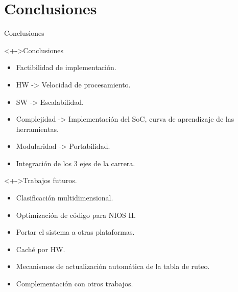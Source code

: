 \documentclass[xcolor=dvipsnames]{beamer}
\begin{document}
\section{Conclusiones}
\begin{frame}{Conclusiones} 
\begin{block}<+->{Conclusiones}   
    \begin{itemize}
      \scriptsize
     	\item Factibilidad de implementación.
     	\item HW -> Velocidad de procesamiento.
     	\item SW -> Escalabilidad.
     	\item Complejidad -> Implementación del SoC, curva de aprendizaje de las herramientas.
     	\item Modularidad -> Portabilidad.
     	\item Integración de los 3 ejes de la carrera.      	
    \end{itemize}
  \end{block}
  \begin{block}<+->{Trabajos futuros.}   
    \begin{itemize}
      \scriptsize
     	\item Clasificación multidimensional.
     	\item Optimización de código para NIOS II.
     	\item Portar el sistema a otras plataformas.
     	\item Caché por HW.
     	\item Mecanismos de actualización automática de la tabla de ruteo.
     	\item Complementación con otros trabajos.     	
    \end{itemize}
  \end{block}
\end{frame}
\end{document}
